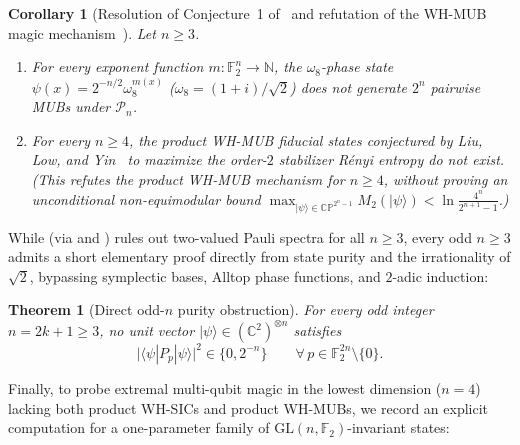 \documentclass[11pt,a4paper]{article}
\theoremstyle{plain}
\newtheorem{maintheorem}{Theorem}
\newtheorem{maincorollary}{Corollary}
\theoremstyle{definition}
\theoremstyle{remark}
\newcommand{\C}{\mathbb{C}}
\newcommand{\N}{\mathbb{N}}
\newcommand{\F}{\mathbb{F}}
\newcommand{\CP}{\mathbb{CP}}
\newcommand{\Pauli}{\mathcal{P}}
\newcommand{\GL}{\mathrm{GL}}
\newcommand{\ket}[1]{|#1\rangle}
\newcommand{\expval}[2]{\langle#1|#2|#1\rangle}
\newcommand{\abs}[1]{\lvert#1\rvert}
\numberwithin{equation}{section}
\begin{document}
\begin{maincorollary}[Resolution of Conjecture~1 of~\cite{damski2026product} and refutation of the WH-MUB magic mechanism~\cite{liu2026maximal}]\label{cor:damski-lly}
Let $n \ge 3$.
\begin{enumerate}[label=(\alph*),leftmargin=2em]
  \item For every exponent function $m : \F_2^n \to \N$, the $\omega_8$-phase state $\psi(x) = 2^{-n/2}\omega_8^{m(x)}$ ($\omega_8 = (1+i)/\sqrt{2}$) does not generate $2^n$ pairwise MUBs under $\Pauli_n$.
  \item For every $n \ge 4$, the product WH-MUB fiducial states conjectured by Liu, Low, and Yin~\cite{liu2026maximal} to maximize the order-$2$ stabilizer R\'enyi entropy do not exist. (This refutes the product WH-MUB mechanism for $n \ge 4$, without proving an unconditional non-equimodular bound $\max_{\ket{\psi}\in\CP^{2^n-1}} M_2(\ket{\psi}) < \ln\frac{4^n}{2^{n+1}-1}$.)
\end{enumerate}
\end{maincorollary}

While  (via  and ) rules out two-valued Pauli spectra for all $n \ge 3$, every odd $n \ge 3$ admits a short elementary proof directly from state purity and the irrationality of $\sqrt{2}$, bypassing symplectic bases, Alltop phase functions, and $2$-adic induction:

\begin{maintheorem}[Direct odd-$n$ purity obstruction]\label{thm:odd-two-valued}
For every odd integer $n = 2k + 1 \ge 3$, no unit vector $\ket{\psi} \in (\C^2)^{\otimes n}$ satisfies
\[
  \abs{\expval{\psi}{P_p}}^2 \in \{0, 2^{-n}\} \qquad \forall\, p \in \F_2^{2n} \setminus \{0\}.
\]
\end{maintheorem}

Finally, to probe extremal multi-qubit magic in the lowest dimension ($n = 4$) lacking both product WH-SICs and product WH-MUBs, we record an explicit computation for a one-parameter family of $\GL(n,\F_2)$-invariant states:
\end{document}
